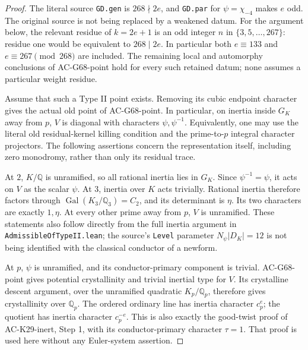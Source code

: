 \begin{proof}
The literal source \texttt{GD.gen} is \(268\nmid2e\), and
\texttt{GD.par} for \(\psi=\chi_{-4}\) makes \(e\) odd.
The original source is not being replaced by a weakened datum.
For the argument below, the relevant residue of \(k=2e+1\) is
an odd integer \(n\) in \(\{3,5,\ldots,267\}\): residue one
would be equivalent to \(268\mid2e\).  In particular both
\(e\equiv133\) and \(e\equiv267\pmod{268}\) are included.
The remaining local and automorphy conclusions of AC-G68-point
hold for every such retained datum; none assumes a particular
weight residue.

Assume that such a Type II point exists.  Removing its cubic
endpoint character gives the actual old point of AC-G68-point.
In particular, on inertia inside \(G_K\) away from \(p\),
\(V\) is diagonal with characters \(\psi,\psi^{-1}\).
Equivalently, one may use the literal old residual-kernel killing
condition and the prime-to-\(p\) integral character projectors.
The following assertions concern the representation itself,
including zero monodromy, rather than only its residual trace.

At \(2\), \(K/\mathbb Q\) is unramified, so all rational inertia
lies in \(G_K\).  Since \(\psi^{-1}=\psi\), it acts on \(V\)
as the scalar \(\psi\).  At \(3\), inertia over \(K\) acts
trivially.  Rational inertia therefore factors through
\(\operatorname{Gal}(K_3/\mathbb Q_3)=C_2\), and its determinant
is \(\eta\).  Its two characters are exactly \(1,\eta\).
At every other prime away from \(p\), \(V\) is unramified.
These statements also follow directly from the full inertia
argument in \texttt{AdmissibleOfTypeII.lean}; the source's
\texttt{Level} parameter \(N_\psi|D_K|=12\) is not being
identified with the classical conductor of a newform.

At \(p\), \(\psi\) is unramified, and its conductor-primary
component is trivial.  AC-G68-point gives potential crystallinity
and trivial inertial type for \(V\).  Its crystalline descent
argument, over the unramified quadratic \(K_p/\mathbb Q_p\),
therefore gives crystallinity over \(\mathbb Q_p\).
The ordered ordinary line has inertia character \(c_p^e\);
the quotient has inertia character \(c_p^{-e}\).
This is also exactly the good-twist proof of AC-K29-inert,
Step 1, with its conductor-primary character \(\tau=1\).
That proof is used here without any Euler-system assertion.


\end{proof}
